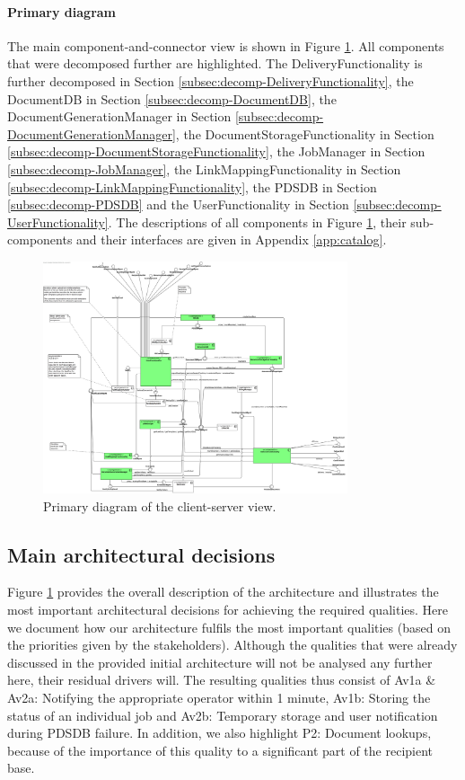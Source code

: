 \documentclass[a4paper,10pt]{article}
\begin{document}
\paragraph{Primary diagram}
The main component-and-connector view is shown in Figure \ref{fig:cs-primary}. All components that were decomposed further are highlighted. The DeliveryFunctionality is further decomposed in Section \ref{subsec:decomp-DeliveryFunctionality}, the DocumentDB in Section \ref{subsec:decomp-DocumentDB}, the DocumentGenerationManager in Section \ref{subsec:decomp-DocumentGenerationManager}, the DocumentStorageFunctionality in Section \ref{subsec:decomp-DocumentStorageFunctionality}, the JobManager in Section \ref{subsec:decomp-JobManager}, the LinkMappingFunctionality in Section \ref{subsec:decomp-LinkMappingFunctionality}, the PDSDB in Section \ref{subsec:decomp-PDSDB} and the UserFunctionality in Section \ref{subsec:decomp-UserFunctionality}. The descriptions of all components in Figure \ref{fig:cs-primary}, their sub-components and their interfaces are given in Appendix \ref*{app:catalog}.

\begin{figure}[!htp]
	\centering
	\includegraphics[width=0.8\textwidth]{ClientServerView.png}
	\caption{Primary diagram of the client-server view.}
	\label{fig:cs-primary}
\end{figure}
\FloatBarrier

\subsection{Main architectural decisions}
Figure \ref{fig:cs-primary} provides the overall description of the architecture and illustrates the most important architectural decisions for achieving the required qualities. Here we document how our architecture fulfils the most important qualities (based on the priorities given by the stakeholders). Although the qualities that were already discussed in the provided initial architecture will not be analysed any further here, their residual drivers will. The resulting qualities thus consist of Av1a \& Av2a: Notifying the appropriate operator within 1 minute, Av1b: Storing the status of an individual job and Av2b: Temporary storage and user notification during PDSDB failure. In addition, we also highlight P2: Document lookups, because of the importance of this quality to a significant part of the recipient base.
\end{document}
